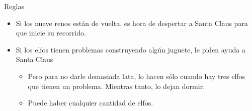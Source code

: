 \documentclass[presentation]{beamer}
\begin{document}
\begin{frame}[label={sec:orgb98f88c}]{Reglas}
\begin{itemize}
\item Si los nueve renos están de vuelta, es hora de despertar a Santa
Claus para que inicie su recorrido.
\item Si los elfos tienen problemas construyendo algún juguete, le piden
ayuda a Santa Claus
\begin{itemize}
\item Pero para no darle demasiada lata, lo hacen sólo cuando hay tres
elfos que tienen un problema. Mientras tanto, lo dejan dormir.
\item Puede haber cualquier cantidad de elfos.
\end{itemize}
\end{itemize}
\end{frame}
\end{document}
